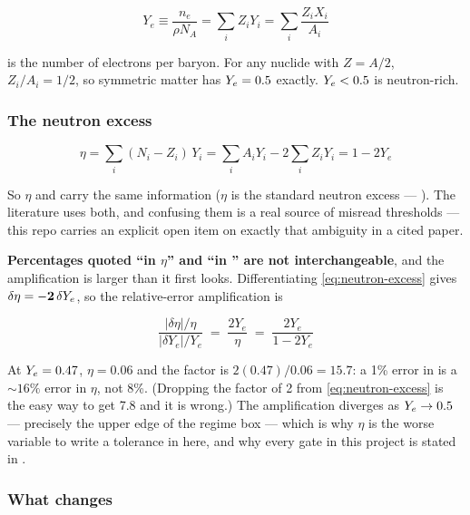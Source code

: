\begin{equation}
Y_e \equiv \frac{n_e}{\rho N_A} = \sum_i Z_i Y_i = \sum_i \frac{Z_i X_i}{A_i}
\label{eq:ye}
\end{equation}

\Ye{} is the number of electrons per baryon. For any nuclide with $Z = A/2$,
$Z_i/A_i = 1/2$, so symmetric matter has $Y_{e} = 0.5$ exactly. $Y_{e} < 0.5$ is
neutron-rich.

\subsubsection{The neutron excess}
\label{sec:neutronexcess}

\begin{equation}
\eta = \sum_i (N_i - Z_i)\,Y_i
     = \sum_i A_i Y_i - 2\sum_i Z_i Y_i = 1 - 2Y_e
\label{eq:neutron-excess}
\end{equation}

So $\eta$ and \Ye{} carry the same information ($\eta$ is the standard neutron
excess --- \citealt{hix1999b}). The literature uses both, and confusing them is
a real source of misread thresholds --- this repo carries an explicit open item
on exactly that ambiguity in a cited paper.

\textbf{Percentages quoted ``in $\eta$'' and ``in \Ye{}'' are not
interchangeable}, and the amplification is larger than it first looks.
Differentiating \eqref{eq:neutron-excess} gives $\delta\eta = \mathbf{-2}\,
\delta Y_{e}$, so the relative-error amplification is

\begin{equation*}
\frac{|\delta\eta|/\eta}{|\delta Y_e|/Y_e}
  \;=\; \frac{2Y_e}{\eta} \;=\; \frac{2Y_e}{1-2Y_e}
\end{equation*}

At $Y_{e} = 0.47$, $\eta = 0.06$ and the factor is
$2(0.47)/0.06 = \mathbf{15.7}$: a 1\% error in \Ye{} is a
\textbf{${\sim}16\%$} error in $\eta$, not 8\%. (Dropping the factor of 2 from
\eqref{eq:neutron-excess} is the easy way to get 7.8 and it is wrong.) The
amplification diverges as $Y_{e} \to 0.5$ --- precisely the upper edge of the
regime box --- which is why $\eta$ is the worse variable to write a tolerance
in here, and why every gate in this project is stated in \Ye{}.

\subsubsection{What changes \texorpdfstring{\Ye{}}{Ye}}
\label{sec:whatchangesye}

